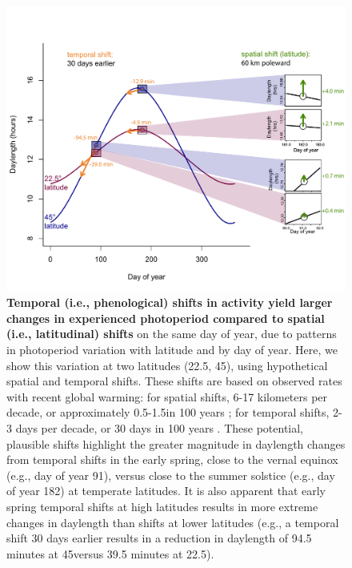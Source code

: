 \documentclass{article}
\begin{document}
\begin{figure}[h]
\centering
\includegraphics{..//..//analyses/photoperiod/figures/photo_spacetime_v4b_newcolors.pdf} %
\caption{\textbf{Temporal (i.e., phenological) shifts in activity yield larger changes in experienced photoperiod compared to spatial (i.e., latitudinal) shifts} on the same day of year, due to patterns in photoperiod variation with latitude and by day of year. Here, we show this variation at two latitudes (22.5\degree, 45\degree), using hypothetical spatial and temporal shifts. These shifts are based on observed rates with recent global warming: for spatial shifts, 6-17 kilometers per decade, or approximately 0.5-1.5\degree in 100 years \citep{parmesan2003,parmesan2006}; for temporal shifts, 2-3 days per decade, or 30 days in 100 years \citep{parmesan2006,chen2011}. These potential, plausible shifts highlight the greater magnitude in daylength changes from temporal shifts in the early spring, close to the vernal equinox (e.g., day of year 91), versus close to the summer solstice (e.g., day of year 182) at temperate latitudes.  It is also apparent that early spring temporal shifts at high latitudes results in more extreme changes in daylength than shifts at lower latitudes (e.g., a temporal shift 30 days earlier results in a reduction in daylength of 94.5 minutes at 45\degree versus 39.5 minutes at 22.5\degree).}
 \label{fig:spacetime}%
 \end{figure}
 
\end{document}
